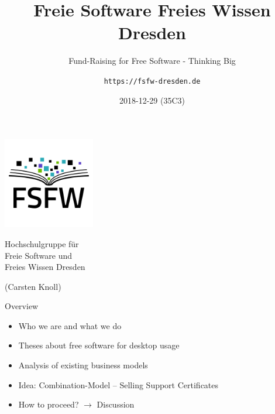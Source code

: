 \documentclass[t]{beamer}
\title{Freie Software Freies Wissen Dresden}
\subtitle{Fund-Raising for Free Software - Thinking Big}
\author{\texttt{https://fsfw-dresden.de}}
\date{2018-12-29 (35C3)}
\begin{document}
\begin{frame}[label=p1]
  \begin{center}%
\vspace*{-1em}
\includegraphics[width=4cm]{img-src/fsfw-logo-with-text}
\vspace{-1em}

\begin{minipage}{37mm}
\begin{center}
Hochschulgruppe für\\
Freie Software und\\
Freies Wissen Dresden
\end{center}
\end{minipage}
\end{center}


\vspace{2em}
\hfill {}
\vspace{1em}

\hfill \footnotesize{(Carsten Knoll)}~~
\end{frame}


\begin{frame}[label=ol]{\color{fg}Overview}
  \begin{itemize}
  \setlength\itemsep{1em}
  \item Who we are and what we do
  \item Theses about free software for desktop usage
  \item Analysis of existing business models
  \item Idea: Combination-Model -- Selling Support Certificates
  \item How to proceed? $\rightarrow$ Discussion
  \end{itemize}
\end{frame}
\end{document}
